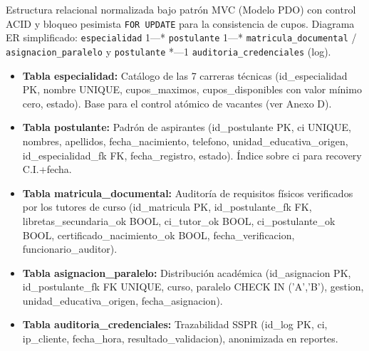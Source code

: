 
Estructura relacional normalizada bajo patrón MVC (Modelo PDO) con control ACID y bloqueo pesimista \texttt{FOR UPDATE} para la consistencia de cupos. Diagrama ER simplificado: \texttt{especialidad} 1---* \texttt{postulante} 1---* \texttt{matricula\_documental} / \texttt{asignacion\_paralelo} y \texttt{postulante} *---1 \texttt{auditoria\_credenciales} (log).

\begin{itemize}
    \item \textbf{Tabla especialidad:} Catálogo de las 7 carreras técnicas (id\_especialidad PK, nombre UNIQUE, cupos\_maximos, cupos\_disponibles con valor mínimo cero, estado). Base para el control atómico de vacantes (ver Anexo D).
    \item \textbf{Tabla postulante:} Padrón de aspirantes (id\_postulante PK, ci UNIQUE, nombres, apellidos, fecha\_nacimiento, telefono, unidad\_educativa\_origen, id\_especialidad\_fk FK, fecha\_registro, estado). Índice sobre ci para recovery C.I.+fecha.
    \item \textbf{Tabla matricula\_documental:} Auditoría de requisitos físicos verificados por los tutores de curso (id\_matricula PK, id\_postulante\_fk FK, libretas\_secundaria\_ok BOOL, ci\_tutor\_ok BOOL, ci\_postulante\_ok BOOL, certificado\_nacimiento\_ok BOOL, fecha\_verificacion, funcionario\_auditor).
    \item \textbf{Tabla asignacion\_paralelo:} Distribución académica (id\_asignacion PK, id\_postulante\_fk FK UNIQUE, curso, paralelo CHECK IN ('A','B'), gestion, unidad\_educativa\_origen, fecha\_asignacion).
    \item \textbf{Tabla auditoria\_credenciales:} Trazabilidad SSPR (id\_log PK, ci, ip\_cliente, fecha\_hora, resultado\_validacion), anonimizada en reportes.
\end{itemize}

